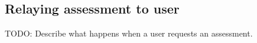 \subsection{Relaying assessment to user}



TODO: Describe what happens when a user requests an assessment.











